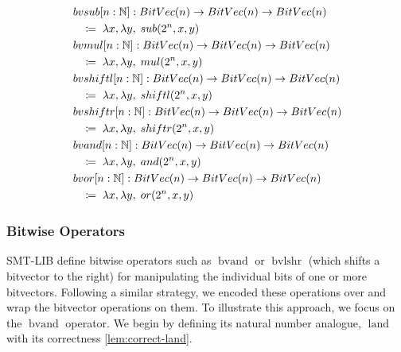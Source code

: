 \begin{definition}
\begin{align*}
&\mathop{bvsub}[n : \mathbb{N}] : \mathop{BitVec}(n) \rightarrow \mathop{BitVec}(n) \rightarrow \mathop{BitVec}(n) \\
&\quad\coloneq\; \lambda x, \lambda y, \; \mathop{sub}(2^n, x, y) \\
&\mathop{bvmul}[n : \mathbb{N}] : \mathop{BitVec}(n) \rightarrow \mathop{BitVec}(n) \rightarrow \mathop{BitVec}(n) \\
&\quad\coloneq\; \lambda x, \lambda y, \; \mathop{mul}(2^n, x, y) \\
&\mathop{bvshiftl}[n : \mathbb{N}] : \mathop{BitVec}(n) \rightarrow \mathop{BitVec}(n) \rightarrow \mathop{BitVec}(n) \\
&\quad\coloneq\; \lambda x, \lambda y, \; \mathop{shiftl}(2^n, x, y) \\
&\mathop{bvshiftr}[n : \mathbb{N}] : \mathop{BitVec}(n) \rightarrow \mathop{BitVec}(n) \rightarrow \mathop{BitVec}(n) \\
&\quad\coloneq\; \lambda x, \lambda y, \; \mathop{shiftr}(2^n, x, y) \\
&\mathop{bvand}[n : \mathbb{N}] : \mathop{BitVec}(n) \rightarrow \mathop{BitVec}(n) \rightarrow \mathop{BitVec}(n) \\
&\quad\coloneq\; \lambda x, \lambda y, \; \mathop{and}(2^n, x, y) \\
&\mathop{bvor}[n : \mathbb{N}] : \mathop{BitVec}(n) \rightarrow \mathop{BitVec}(n) \rightarrow \mathop{BitVec}(n) \\
&\quad\coloneq\; \lambda x, \lambda y, \; \mathop{or}(2^n, x, y)
\end{align*}
\end{definition}


\subsubsection{Bitwise Operators}


SMT-LIB define bitwise operators such as $\mathop{bvand}$ or $\mathop{bvlshr}$  (which shifts a bitvector to the right) for manipulating the individual bits of one or more bitvectors. 
 Following a similar strategy, we encoded these operations over \N and wrap the bitvector operations on them. To illustrate this approach, we focus on the $\mathop{bvand}$ operator.
We begin by defining its natural number analogue, $\mathop{land}$ with its correctness \cref{lem:correct-land}.

